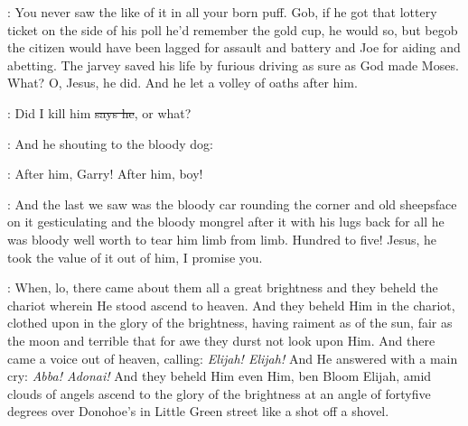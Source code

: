 \Nq:
You never saw the like of it in all your born puff. Gob, if he got that
lottery ticket on the side of his poll he'd remember the gold cup,
he would so, but begob the citizen would have been lagged for assault
and battery and Joe for aiding and abetting.
The jarvey saved his life
by furious driving as sure as God made Moses. What? O, Jesus, he did.
And he let a volley of oaths after him.

\citizen:
Did I kill him \sout{says he}, or what?

\Nq:
And he shouting to the bloody dog:

\citizen:
After him, Garry! After him, boy!

\Nq:
And the last we saw was the bloody car rounding the corner and old
sheepsface on it gesticulating and the bloody mongrel after it with his
lugs back for all he was bloody well worth to tear him limb from limb.
Hundred to five! Jesus, he took the value of it out of him,
I promise you.

:
When, lo,
there came about them all a great brightness and they
beheld the chariot wherein He stood ascend to heaven. And they beheld
Him in the chariot, clothed upon in the glory of the brightness, having
raiment as of the sun, fair as the moon and terrible that for awe they
durst not look upon Him. And there came a voice out of heaven, calling:
\emph{Elijah! Elijah!} And He answered with a main cry:
\emph{Abba! Adonai!} And they
beheld Him even Him, ben Bloom Elijah, amid clouds of angels ascend
to the glory of the brightness at an angle of fortyfive degrees over
Donohoe's in Little Green street like a shot off a shovel.
